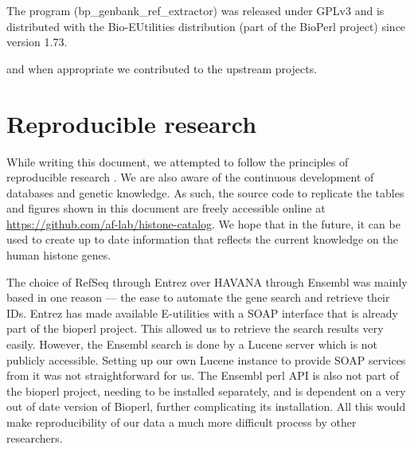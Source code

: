 \documentclass[10pt,a4paper,twocolumn,article]{memoir}
\begin{document}
    The program (bp\_genbank\_ref\_extractor) was released under GPLv3 and is distributed with
    the Bio-EUtilities distribution (part of the BioPerl project) since version 1.73.


    and when appropriate we contributed to the upstream projects.




  \section{Reproducible research}
  \label{sec:reproducible}
    While writing this document, we attempted to follow the principles of reproducible research
    \citep{reproducible-research-bioinformatics, reproducible-research-law}.
    We are also aware of the continuous development of databases and genetic knowledge. As such,
    the source code to replicate the tables and figures shown in this document are freely accessible
    online at \url{https://github.com/af-lab/histone-catalog}. We hope that in the future, it can
    be used to create up to date information
    that reflects the current knowledge on the human histone genes.

    The choice of RefSeq through Entrez over HAVANA through Ensembl was mainly based in one reason --- the ease
    to automate the gene search and retrieve their IDs. Entrez has made available E-utilities with a SOAP interface
    that is already part of the bioperl project. This allowed us to retrieve the search results very easily.
    However, the Ensembl search is done by a Lucene server which is not publicly accessible. Setting up our own
    Lucene instance to provide SOAP services from it was not straightforward for us. The Ensembl perl API is
    also not part of the bioperl project, needing to be installed separately, and is dependent on a very
    out of date version of Bioperl, further complicating its installation. All this would make reproducibility
    of our data a much more difficult process by other researchers.
\end{document}
